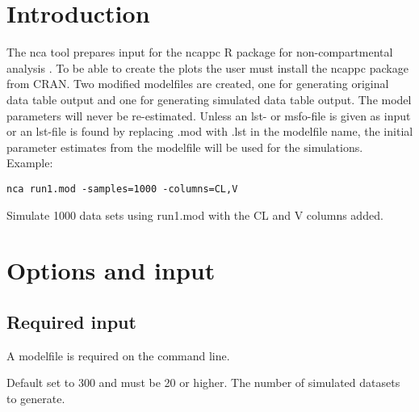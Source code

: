 

\newcommand{\guidetoolname}{nca}



\maketitle

\section{Introduction}
The nca tool prepares input for the ncappc R package for non-compartmental analysis \cite{Chayan}. To be able to create the plots the user must install the ncappc package from CRAN. Two modified modelfiles are created, one for generating original data table output and one for generating simulated data table output. The model parameters will never be re-estimated. Unless an lst- or msfo-file is given as input or an lst-file is found by replacing .mod with .lst in the modelfile name, the initial parameter estimates from the modelfile will be used for the simulations.\\
Example:
\begin{verbatim}
nca run1.mod -samples=1000 -columns=CL,V
\end{verbatim}
Simulate 1000 data sets using run1.mod with the CL and V columns added.

\section{Options and input}

\subsection{Required input}
A modelfile is required on the command line.
\begin{optionlist}
Default set to 300 and must be 20 or higher. The number of simulated datasets to generate. 
\nextopt
\end{optionlist}

